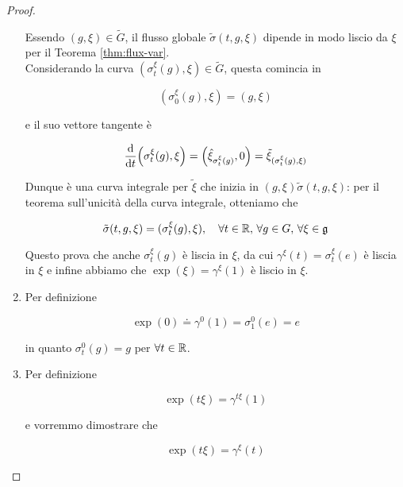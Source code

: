 \begin{proof}
\begin{enumerate}
		Essendo $ (g,\xi) \in \tilde{G} $, il flusso globale $ \tilde{\sigma}(t,g,\xi) $ dipende in modo liscio da $ \xi $ per il Teorema \ref{thm:flux-var}.\\
		Considerando la curva $ (\sigma_{t}^{\xi}(g),\xi) \in \tilde{G} $, questa comincia in
		
		\begin{equation}
			(\sigma_{0}^{\xi}(g),\xi) = (g,\xi)
		\end{equation}
	
		e il suo vettore tangente è
		
		\begin{equation}
			\dv{t} (\sigma_{t}^{\xi}(g),\xi) = \left( \hat{\xi}_{\sigma_{t}^{\xi}(g)}, 0 \right) = \tilde{\xi}_{(\sigma_{t}^{\xi}(g),\xi)}
		\end{equation}
	
		Dunque è una curva integrale per $ \tilde{\xi} $ che inizia in $ (g,\xi) $$ \tilde{\sigma}(t,g,\xi) $: per il teorema sull'unicità della curva integrale, otteniamo che
		
		\begin{equation}
			\tilde{\sigma}(t,g,\xi) = (\sigma_{t}^{\xi}(g),\xi) \qcomma \forall t \in \R, \, \forall g \in G, \, \forall \xi \in \g
		\end{equation}
	
		Questo prova che anche $ \sigma_{t}^{\xi}(g) $ è liscia in $ \xi $, da cui $ \gamma^{\xi}(t) = \sigma_{t}^{\xi}(e) $ è liscia in $ \xi $ e infine abbiamo che $ \exp(\xi) = \gamma^{\xi}(1) $ è liscio in $ \xi $.
		
		\item Per definizione
		
		\begin{equation}
			\exp(0) \doteq \gamma^{0}(1) = \sigma_{1}^{0}(e) = e
		\end{equation}
	
		in quanto $ \sigma_{t}^{0}(g) = g $ per $ \forall t \in \mathbb{R} $.
		
		\item Per definizione
		
		\begin{equation}
			\exp(t \xi) = \gamma^{t \xi}(1)
		\end{equation}
	
		e vorremmo dimostrare che
		
		\begin{equation}
			\exp(t \xi) = \gamma^{\xi}(t)
		\end{equation}
	

\end{enumerate}
\end{proof}
